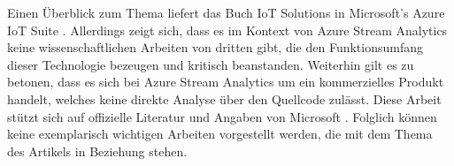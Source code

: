Einen Überblick zum Thema liefert das Buch IoT Solutions in Microsoft's Azure IoT Suite \cite{Klein.2017}. Allerdings zeigt sich, dass es im Kontext von Azure Stream Analytics keine wissenschaftlichen Arbeiten von dritten gibt, die den Funktionsumfang dieser Technologie bezeugen und kritisch beanstanden. Weiterhin gilt es zu betonen, dass es sich bei Azure Stream Analytics um ein kommerzielles Produkt handelt, welches keine direkte Analyse über den Quellcode zulässt. Diese Arbeit stützt sich auf offizielle Literatur und Angaben von Microsoft \cite{Familiar.2017} \cite{Klein.2017}. Folglich können keine exemplarisch wichtigen Arbeiten vorgestellt werden, die mit dem Thema des Artikels in Beziehung stehen.